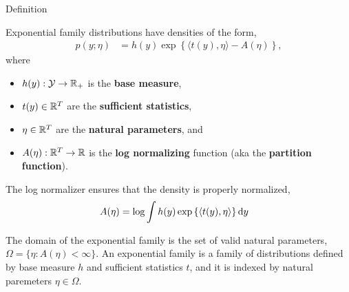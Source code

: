 \documentclass[aspectratio=169]{beamer}
\begin{document}
\begin{frame}[t,allowframebreaks]{Definition}\label{definition}

Exponential family distributions have densities of the form,
\begin{align*}
    p(y; \eta) &= h(y) \exp \left \{\langle t(y), \eta \rangle - A(\eta) \right\},
\end{align*} where 
\begin{itemize}
    \item \(h(y): \mathcal{Y} \to \mathbb{R}_+\) is the \textbf{base measure}, 
    \item \(t(y) \in \mathbb{R}^T\) are the \textbf{sufficient statistics}, 
    \item \(\eta \in \mathbb{R}^T\) are the \textbf{natural parameters}, and 
    \item \(A(\eta): \mathbb{R}^T \to \mathbb{R}\) is the \textbf{log normalizing} function (aka the \textbf{partition function}).
\end{itemize}

The log normalizer ensures that the density is properly normalized,
\begin{align*}
    A(\eta) &= \log \int h(y) \exp \left \{\langle t(y), \eta \rangle \right\} \mathop{}\!\mathrm{d} y
\end{align*}

The domain of the exponential family is the set of valid natural
parameters, \(\Omega = \{\eta: A(\eta) < \infty\}\). An exponential
family is a family of distributions defined by base measure \(h\) and
sufficient statistics \(t\), and it is indexed by natural paremeters
\(\eta \in \Omega\).
\end{frame}



\end{document}
